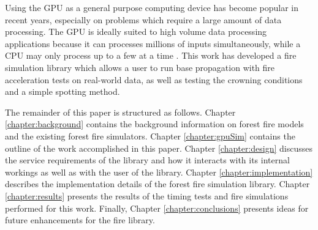 Using the GPU as a general purpose computing device has become popular in recent years, especially on problems which require a large amount of data processing. The GPU is ideally suited to high volume data processing applications because it can processes millions of inputs simultaneously, while a CPU may only process up to a few at a time \cite{cudabyexample}. This work has developed a fire simulation library which allows a user to run base propagation with fire acceleration tests on real-world data, as well as testing the crowning conditions and a simple spotting method. 

The remainder of this paper is structured as follows. Chapter \ref{chapter:background} contains the background information on forest fire models and the existing forest fire simulators. Chapter \ref{chapter:gpuSim} contains the outline of the work accomplished in this paper. Chapter \ref{chapter:design} discusses the service requirements of the library and how it interacts with its internal workings as well as with the user of the library. Chapter \ref{chapter:implementation} describes the implementation details of the forest fire simulation library. Chapter \ref{chapter:results} presents the results of the timing tests and fire simulations performed for this work. Finally, Chapter \ref{chapter:conclusions} presents ideas for future enhancements for the fire library. 